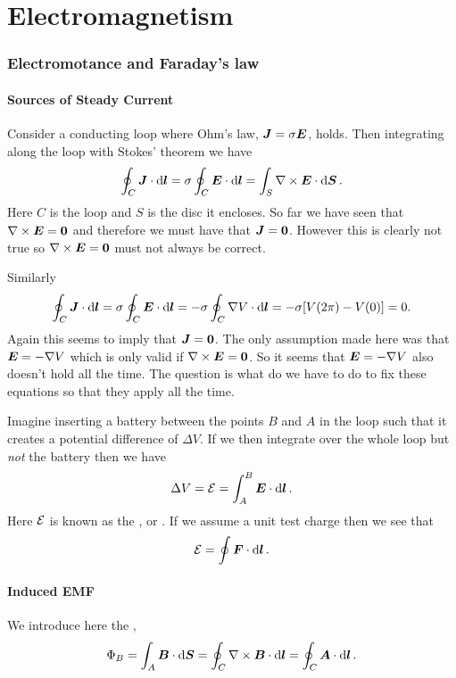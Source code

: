 \part{Electromagnetism}
    \section{Electromotance and Faraday's law}
    \subsection{Sources of Steady Current}\label{sec:sources of steady current}
    Consider a conducting loop where Ohm's law, \(\bm{J} = \sigma\bm{E}\), holds.
    Then integrating along the loop with Stokes' theorem we have
    \[\oint_C\bm{J}\cdot\dd{\bm{l}} = \sigma\oint_C\bm{E}\cdot\dd{\bm{l}} = \int_S\nabla\times\bm{E}\cdot\dd{\bm{S}}.\]
    Here \(C\) is the loop and \(S\) is the disc it encloses.
    So far we have seen that \(\nabla\times\bm{E} = \bm{0}\) and therefore we must have that \(\bm{J} = \bm{0}\).
    However this is clearly not true so \(\nabla\times\bm{E} = \bm{0}\) must not always be correct.
    
    Similarly
    \[\oint_C\bm{J}\cdot\dd{\bm{l}} = \sigma\oint_C\bm{E}\cdot\dd{\bm{l}} = -\sigma\oint_C\nabla V\cdot\dd{\bm{l}} = -\sigma [V(2\pi) - V(0)] = 0.\]
    Again this seems to imply that \(\bm{J} = \bm{0}\).
    The only assumption made here was that \(\bm{E} = -\nabla V\) which is only valid if \(\nabla\times\bm{E} = \bm{0}\).
    So it seems that \(\bm{E} = -\nabla V\) also doesn't hold all the time.
    The question is what do we have to do to fix these equations so that they apply all the time.
    
    Imagine inserting a battery between the points \(B\) and \(A\) in the loop such that it creates a potential difference of \(\Delta V\).
    If we then integrate over the whole loop but \emph{not} the battery then we have
    \[\Delta V = \mathcal{E} = \int_A^B \bm{E}\cdot\dd{\bm{l}}.\]
    Here \(\mathcal{E}\) is known as the , or .
    If we assume a unit test charge then we see that
    \[\mathcal{E} = \oint\bm{F}\cdot\dd{\bm{l}}.\]
    
    \subsection{Induced EMF}
    We introduce here the ,
    \[\Phi_B = \int_A\bm{B}\cdot\dd{\bm{S}} = \oint_C\nabla\times\bm{B}\cdot\dd{\bm{l}} = \oint_C\bm{A}\cdot\dd{\bm{l}}.\]
    
